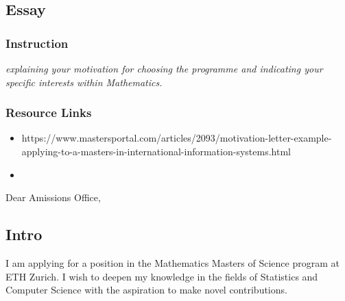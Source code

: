\subsection*{Essay}\label{sec:essay}

\subsubsection*{Instruction}
\textit{explaining your motivation for choosing the programme and indicating your specific interests within Mathematics.}

\subsubsection*{Resource Links}
\begin{itemize}
    \item https://www.mastersportal.com/articles/2093/motivation-letter-example-applying-to-a-masters-in-international-information-systems.html
    \item 
\end{itemize}

Dear Amissions Office,\\
\subsection*{Intro}
I am applying for a position in the Mathematics Masters of Science program at ETH Zurich. I wish to deepen my knowledge in the fields of Statistics and Computer Science with the aspiration to make novel contributions.\\
